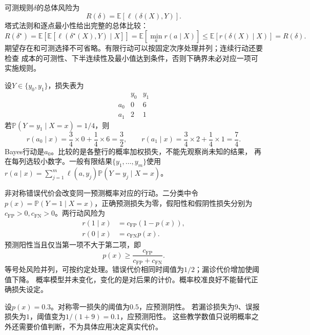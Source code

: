 可测规则$\delta$的总体风险为
\begin{equation}
  R(\delta)=\mathbb E[\ell(\delta(X),Y)].
  \label{eq:decision-rule-risk}
\end{equation}
塔式法则和逐点最小性给出完整的总体比较：
\[
  R(\delta^\star)
  =\mathbb E\!\left[\mathbb E[\ell(\delta^\star(X),Y)\mid X]\right]
  =\mathbb E[\min_a r(a\mid X)]
  \leq\mathbb E[r(\delta(X)\mid X)]
  =R(\delta).
\]
期望存在和可测选择不可省略。有限行动可以按固定次序处理并列；连续行动还要检查
成本的可测性、下半连续性及最小值达到条件，否则下确界未必对应一项可实施规则。

\begin{example}[有限损失表的逐项计算]
\label{ex:decision-finite-loss-table}
设$Y\in\{y_0,y_1\}$，损失表为
\[
  \begin{array}{c|cc}
    &y_0&y_1\\ \hline
    a_0&0&6\\
    a_1&2&1
  \end{array}
\]
若$\mathbb P(Y=y_1\mid X=x)=1/4$，则
\[
  r(a_0\mid x)=\frac34\times0+\frac14\times6=\frac32,\qquad
  r(a_1\mid x)=\frac34\times2+\frac14\times1=\frac74.
\]
Bayes行动是$a_0$。比较的是各整行的概率加权损失，不能先观察尚未知的结果，
再在每列选较小数字。一般有限结果$\{y_1,\ldots,y_m\}$使用
$r(a\mid x)=\sum_{j=1}^m\ell(a,y_j)\mathbb P(Y=y_j\mid X=x)$。
\end{example}

非对称错误代价会改变同一预测概率对应的行动。二分类中令
$p(x)=\mathbb P(Y=1\mid X=x)$，正确预测损失为零，假阳性和假阴性损失分别为
$c_{\mathrm{FP}}>0,c_{\mathrm{FN}}>0$。两行动风险为
\begin{align}
  r(1\mid x)&=c_{\mathrm{FP}}(1-p(x)),
  \label{eq:decision-binary-risk-positive}\\
  r(0\mid x)&=c_{\mathrm{FN}}p(x).
  \label{eq:decision-binary-risk-negative}
\end{align}
预测阳性当且仅当第一项不大于第二项，即
\begin{equation}
  p(x)\geq\frac{c_{\mathrm{FP}}}{c_{\mathrm{FP}}+c_{\mathrm{FN}}}.
  \label{eq:decision-cost-sensitive-threshold}
\end{equation}
等号处风险并列，可按约定处理。错误代价相同时阈值为$1/2$；漏诊代价增加使阈值下降。
概率模型并未变化，变化的是对后果的计价。概率校准良好不能替代正确损失设定。

\begin{example}[同一概率对应不同合理行动]
\label{ex:decision-same-probability-different-actions}
设$p(x)=0.3$。对称零一损失的阈值为$0.5$，应预测阴性。
若漏诊损失为$9$、误报损失为$1$，阈值变为$1/(1+9)=0.1$，应预测阳性。
这些教学数值只说明概率之外还需要价值判断，不为具体应用决定真实代价。
\end{example}

